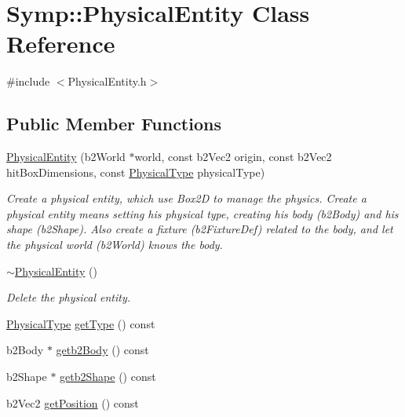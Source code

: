 \hypertarget{class_symp_1_1_physical_entity}{\section{Symp\-:\-:Physical\-Entity Class Reference}
\label{class_symp_1_1_physical_entity}
}


{\ttfamily \#include $<$Physical\-Entity.\-h$>$}

\subsection*{Public Member Functions}
\begin{DoxyCompactItemize}
\item 
\hyperlink{class_symp_1_1_physical_entity_a525034641510b5b899dcf1ad100e2af5}{Physical\-Entity} (b2\-World $\ast$world, const b2\-Vec2 origin, const b2\-Vec2 hit\-Box\-Dimensions, const \hyperlink{namespace_symp_aebf0e58b2f3c80a5dfa3ddbe64ace7e5}{Physical\-Type} physical\-Type)
\begin{DoxyCompactList}\small\item\em Create a physical entity, which use Box2\-D to manage the physics. Create a physical entity means setting his physical type, creating his body (b2\-Body) and his shape (b2\-Shape). Also create a fixture (b2\-Fixture\-Def) related to the body, and let the physical world (b2\-World) knows the body. \end{DoxyCompactList}\item 
\hyperlink{class_symp_1_1_physical_entity_a48f616ea256c284cdfd18dcbd51b131a}{$\sim$\-Physical\-Entity} ()
\begin{DoxyCompactList}\small\item\em Delete the physical entity. \end{DoxyCompactList}\item 
\hyperlink{namespace_symp_aebf0e58b2f3c80a5dfa3ddbe64ace7e5}{Physical\-Type} \hyperlink{class_symp_1_1_physical_entity_a3a11214e4d8788fd8a6da7a1b5783e4e}{get\-Type} () const 
\item 
b2\-Body $\ast$ \hyperlink{class_symp_1_1_physical_entity_abd9fb0b9d34a09ec4253a51f8ff2624b}{getb2\-Body} () const 
\item 
b2\-Shape $\ast$ \hyperlink{class_symp_1_1_physical_entity_a9ec117f63722547a8345ef3f41a5636c}{getb2\-Shape} () const 
\item 
b2\-Vec2 \hyperlink{class_symp_1_1_physical_entity_a3380966bfcaaf2a094b60879b651993d}{get\-Position} () const 

\end{DoxyCompactItemize}
